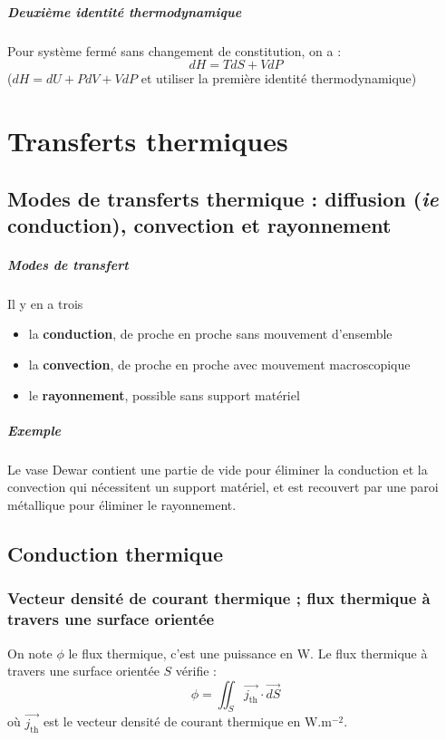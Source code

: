\documentclass[french]{book}
\theoremstyle{plain}
\theoremstyle{definition}
\theoremstyle{remark}
\begin{document}
\paragraph{Deuxième identité thermodynamique} Pour système fermé sans changement de constitution, on a : $$dH=TdS+VdP$$
($dH=dU+PdV+VdP$ et utiliser la première identité thermodynamique)

\chapter{Transferts thermiques}
\localtableofcontents
\section{Modes de transferts thermique : diffusion (\textit{ie} conduction), convection et rayonnement}
\paragraph{Modes de transfert} Il y en a trois 
\begin{itemize}
	\item la \textbf{conduction}, de proche en proche sans mouvement d’ensemble
	\item la \textbf{convection}, de proche en proche avec mouvement macroscopique
	\item le \textbf{rayonnement}, possible sans support matériel
\end{itemize}
\paragraph{Exemple} Le vase Dewar contient une partie de vide pour éliminer la conduction et la convection qui nécessitent un support matériel, et est recouvert par une paroi métallique pour éliminer le rayonnement.
\section{Conduction thermique}
\subsection{Vecteur densité de courant thermique ; flux thermique à travers une surface orientée}
On note $\phi$ le flux thermique, c'est une puissance en W. Le flux thermique à travers une surface orientée $S$ vérifie : $$\phi=\iint_S\overrightarrow{j_{\text{th}}}\cdot\overrightarrow{dS}$$ où $\overrightarrow{j_\text{th}}$ est le vecteur densité de courant thermique en W.m$^{-2}$.
\end{document}
